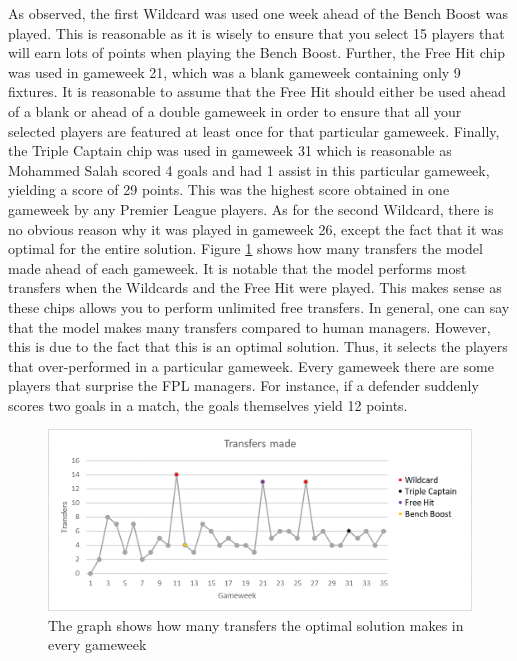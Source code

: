 As observed, the first Wildcard was used one week ahead of the Bench Boost was played. This is reasonable as it is wisely to ensure that you select 15 players that will earn lots of points when playing the Bench Boost. Further, the Free Hit chip was used in gameweek 21, which was a blank gameweek containing only 9 fixtures. It is reasonable to assume that the Free Hit should either be used ahead of a blank or ahead of a double gameweek in order to ensure that all your selected players are featured at least once for that particular gameweek. Finally, the Triple Captain chip was used in gameweek 31 which is reasonable as Mohammed Salah scored 4 goals and had 1 assist in this particular gameweek, yielding a score of 29 points. This was the highest score obtained in one gameweek by any Premier League players. As for the second Wildcard, there is no obvious reason why it was played in gameweek 26, except the fact that it was optimal for the entire solution. 
\newpar
Figure \ref{Figure_Transfers} shows how many transfers the model made ahead of each gameweek. It is notable that the model performs most transfers when the Wildcards and the Free Hit were played. This makes sense as these chips allows you to perform unlimited free transfers. In general, one can say that the model makes many transfers compared to human managers. However, this is due to the fact that this is an optimal solution. Thus, it selects the players that over-performed in a particular gameweek. Every gameweek there are some players that surprise the FPL managers. For instance, if a defender suddenly scores two goals in a match, the goals themselves yield 12 points. 

\begin{figure}[H]
\label{fig_Transfers}
    \centering
    \includegraphics[scale=0.75]{fig/chapter_7/Transfers_colour.png}
    \caption{The graph shows how many transfers the optimal solution makes in every gameweek}
\label{Figure_Transfers}    
\end{figure}


